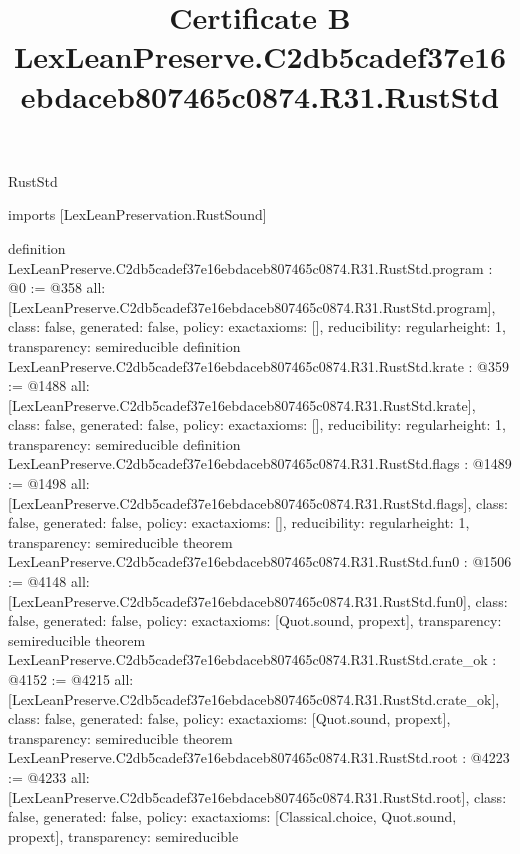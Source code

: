 \begin{lexlean}{RustStd}
\title{Certificate B LexLeanPreserve.C2db5cadef37e16ebdaceb807465c0874.R31.RustStd}
\begin{coremodule}
imports [LexLeanPreservation.RustSound]

definition LexLeanPreserve.C2db5cadef37e16ebdaceb807465c0874.R31.RustStd.program : @0 := @358 {
  all: [LexLeanPreserve.C2db5cadef37e16ebdaceb807465c0874.R31.RustStd.program],
  class: false,
  generated: false,
  policy: exact{axioms: []},
  reducibility: regular{height: 1},
  transparency: semireducible
}
definition LexLeanPreserve.C2db5cadef37e16ebdaceb807465c0874.R31.RustStd.krate : @359 := @1488 {
  all: [LexLeanPreserve.C2db5cadef37e16ebdaceb807465c0874.R31.RustStd.krate],
  class: false,
  generated: false,
  policy: exact{axioms: []},
  reducibility: regular{height: 1},
  transparency: semireducible
}
definition LexLeanPreserve.C2db5cadef37e16ebdaceb807465c0874.R31.RustStd.flags : @1489 := @1498 {
  all: [LexLeanPreserve.C2db5cadef37e16ebdaceb807465c0874.R31.RustStd.flags],
  class: false,
  generated: false,
  policy: exact{axioms: []},
  reducibility: regular{height: 1},
  transparency: semireducible
}
theorem LexLeanPreserve.C2db5cadef37e16ebdaceb807465c0874.R31.RustStd.fun0 : @1506 := @4148 {
  all: [LexLeanPreserve.C2db5cadef37e16ebdaceb807465c0874.R31.RustStd.fun0],
  class: false,
  generated: false,
  policy: exact{axioms: [Quot.sound, propext]},
  transparency: semireducible
}
theorem LexLeanPreserve.C2db5cadef37e16ebdaceb807465c0874.R31.RustStd.crate_ok : @4152 := @4215 {
  all: [LexLeanPreserve.C2db5cadef37e16ebdaceb807465c0874.R31.RustStd.crate_ok],
  class: false,
  generated: false,
  policy: exact{axioms: [Quot.sound, propext]},
  transparency: semireducible
}
theorem LexLeanPreserve.C2db5cadef37e16ebdaceb807465c0874.R31.RustStd.root : @4223 := @4233 {
  all: [LexLeanPreserve.C2db5cadef37e16ebdaceb807465c0874.R31.RustStd.root],
  class: false,
  generated: false,
  policy: exact{axioms: [Classical.choice, Quot.sound, propext]},
  transparency: semireducible
}


\end{coremodule}
\end{lexlean}
